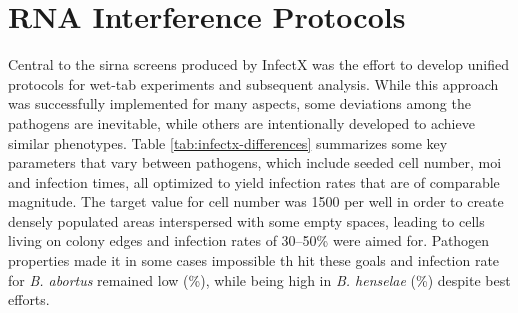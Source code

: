 \section{RNA Interference Protocols}
Central to the \gls{sirna} screens produced by InfectX was the effort to develop unified protocols for wet-tab experiments and subsequent analysis. While this approach was successfully implemented for many aspects, some deviations among the pathogens are inevitable, while others are intentionally developed to achieve similar phenotypes. Table \ref{tab:infectx-differences} summarizes some key parameters that vary between pathogens, which include seeded cell number, \gls{moi} and infection times, all optimized to yield infection rates that are of comparable magnitude. The target value for cell number was 1500 per well in order to create densely populated areas interspersed with some empty spaces, leading to cells living on colony edges and infection rates of 30--50\% were aimed for. Pathogen properties made it in some cases impossible th hit these goals and infection rate for \textit{B. abortus} remained low (\%), while being high in \textit{B. henselae} (\%) despite best efforts.

